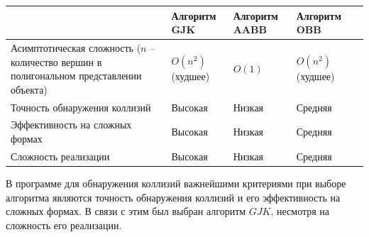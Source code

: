 \noindent
\begin{adjustbox}{width=1\textwidth}
    \begin{tabular}{|p{}|p{}|p{}|p{}|p{}|}
        \hline
        &
        Алгоритм GJK
        &
        Алгоритм AABB
        &
        Алгоритм OBB
        \\
        \hline
        Асимптотическая сложность ($n$ -- количество вершин в полигональном
        представлении объекта)
        &
        \cellcolor{black!12}
        $O(n^2)$ (худшее)
        &
        \cellcolor{black!5}
        $O(1)$
        &
        \cellcolor{black!12}
        $O(n^2)$ (худшее)
        \\
        \hline
        Точность обнаружения коллизий
        &
        \cellcolor{black!5}
        Высокая
        &
        \cellcolor{black!25}
        Низкая
        &
        \cellcolor{black!12}
        Средняя
        \\
        \hline
        Эффективность на сложных формах
        &
        \cellcolor{black!5}
        Высокая
        &
        \cellcolor{black!25}
        Низкая
        &
        \cellcolor{black!12}
        Средняя
        \\
        \hline
        Сложность реализации
        &
        \cellcolor{black!25}
        Высокая
        &
        \cellcolor{black!5}
        Низкая
        &
        \cellcolor{black!12}
        Средняя
        \\
        \hline
    \end{tabular}
\end{adjustbox}

\vspace{0.5cm}

В программе для обнаружения коллизий важнейшими критериями при выборе алгоритма
являются точность обнаружения коллизий и его эффективность на сложных формах. В
связи с этим был выбран алгоритм $GJK$, несмотря на сложность его реализации.
